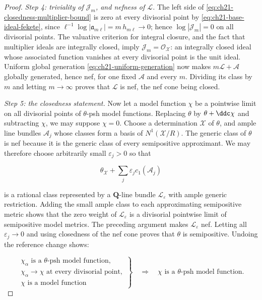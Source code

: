 \begin{proof}
\emph{Step 4: triviality of $\mathcal J_m$, and nefness of
$\mathcal L$.}
The left side of \eqref{eq:ch21-closedness-multiplier-bound}
is zero at every divisorial point by
\eqref{eq:ch21-base-ideal-fekete}, since
$\ell^{-1}\log|\mathfrak a_{m\ell}|=m\,h_{m\ell}\to0$; hence
$\log|\mathcal J_m|=0$ on all divisorial points.  The valuative criterion
for integral closure, and the fact that multiplier ideals are integrally
closed, imply $\mathcal J_m=\mathcal O_{\mathcal X}$: an integrally closed
ideal whose associated function vanishes at every divisorial point is the
unit ideal.  Uniform global
generation \eqref{eq:ch21-uniform-generation}
now makes $m\mathcal L+\mathcal A$ globally generated, hence
nef, for one fixed $\mathcal A$ and every $m$.  Dividing its class by
$m$ and letting $m\to\infty$ proves that $\mathcal L$ is nef, the nef
cone being closed.

\emph{Step 5: the closedness statement.}
Now let a model function $\chi$ be a pointwise limit on all divisorial
points of $\theta$-psh model functions.  Replacing $\theta$ by
$\theta+\ddc\chi$ and subtracting $\chi$, we may suppose
$\chi=0$.  Choose a determination $\mathcal X$ of $\theta$, and ample
line bundles $\mathcal A_j$ whose classes form a basis of
$N^1(\mathcal X/R)$.  The generic class of $\theta$ is nef because it is
the generic class of every semipositive approximant.  We may therefore
choose arbitrarily small $\varepsilon_j>0$ so that

\[
          \theta_{\mathcal X}+\sum_j\varepsilon_jc_1(\mathcal A_j)
\]

is a rational class represented by a $\mathbf Q$-line bundle
$\mathcal L_{\varepsilon}$ with ample generic restriction.  Adding the
small ample class to each approximating semipositive metric shows that the
zero weight of $\mathcal L_{\varepsilon}$ is a divisorial pointwise limit
of semipositive model metrics.  The preceding argument makes
$\mathcal L_{\varepsilon}$ nef.  Letting all $\varepsilon_j\to0$ and
using closedness of the nef cone proves that $\theta$ is semipositive.
Undoing the reference change shows:

\begin{equation}
\label{eq:ch21-model-closedness}
 \left.
 \begin{array}{c}
 \chi_\alpha\text{ is a $\theta$-psh model function},\\
 \chi_\alpha\to\chi\text{ at every divisorial point},\\
 \chi\text{ is a model function}
 \end{array}
 \right\}
 \quad\Longrightarrow\quad
 \chi\text{ is a $\theta$-psh model function}.
\end{equation}


\end{proof}
